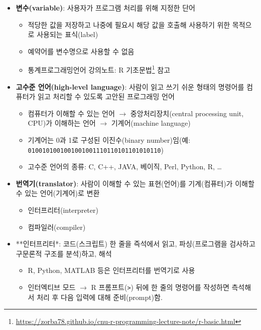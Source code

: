 \documentclass[
  11pt,
]{krantz}
\providecommand{\tightlist}{%
  \setlength{\itemsep}{0pt}\setlength{\parskip}{0pt}}
\renewcommand{\href}[2]{#2\footnote{\url{#1}}}
\begin{document}
\begin{itemize}
\tightlist
\item
  \textbf{변수(variable)}: 사용자가 프로그램 처리를 위해 지정한 단어

  \begin{itemize}
  \tightlist
  \item
    적당한 값을 저장하고 나중에 필요시 해당 값을 호출해 사용하기 위한 목적으로 사용되는 표식(label)
  \item
    예약어를 변수명으로 사용할 수 없음
  \item
    \href{https://zorba78.github.io/cnu-r-programming-lecture-note/r-basic.html}{통계프로그래밍언어 강의노트: R 기초문법} 참고
  \end{itemize}
\item
  \textbf{고수준 언어(high-level language)}: 사람이 읽고 쓰기 쉬운 형태의 명령어를 컴퓨터가 읽고 처리할 수 있도록 고안된 프로그래밍 언어

  \begin{itemize}
  \tightlist
  \item
    컴퓨터가 이해할 수 있는 언어 \(\rightarrow\) 중앙처리장치(central processing unit, CPU)가 이해하는 언어 \(\rightarrow\) 기계어(machine language)
  \item
    기계어는 0과 1로 구성된 이진수(binary number)임(예: \texttt{0100101001001001001110110101101010110})
  \item
    고수준 언어의 종류: C, C++, JAVA, 베이직, Perl, Python, R, \ldots{}
  \end{itemize}
\item
  \textbf{번역기(translator)}: 사람이 이해할 수 있는 표현(언어)를 기계(컴퓨터)가 이해할 수 있는 언어(기계어)로 변환

  \begin{itemize}
  \tightlist
  \item
    인터프리터(interpreter)
  \item
    컴파일러(compiler)
  \end{itemize}
\item
  **인터프리터*: 코드(스크립트) 한 줄을 즉석에서 읽고, 파싱(프로그램을 검사하고 구문론적 구조를 분석)하고, 해석

  \begin{itemize}
  \tightlist
  \item
    R, Python, MATLAB 등은 인터프리터를 번역기로 사용
  \item
    인터엑티브 모드 \(\rightarrow\) R 프롬프트(\texttt{\textgreater{}}) 뒤에 한 줄의 명령어를 작성하면 측석해서 처리 후 다음 입력에 대해 준비(prompt)함.
  \end{itemize}
\end{itemize}
\end{document}
